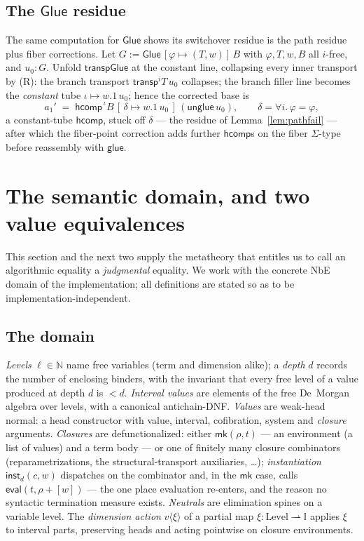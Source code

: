 \documentclass{lmcs}
\newcommand{\I}{\mathbb{I}}
\newcommand{\transp}{\mathsf{transp}}
\newcommand{\hcomp}{\mathsf{hcomp}}
\newcommand{\Glue}{\mathsf{Glue}}
\newcommand{\glue}{\mathsf{glue}}
\newcommand{\unglue}{\mathsf{unglue}}
\newcommand{\evalop}{\mathsf{eval}}
\newcommand{\capp}{\mathsf{inst}}
\begin{document}
\subsection{The $\Glue$ residue}
\label{sec:glueresidue}

The same computation for $\Glue$ shows its switchover residue is the
path residue plus fiber corrections.  Let
$G := \Glue\,[\varphi \mapsto (T, w)]\,B$ with $\varphi, T, w, B$ all
$i$-free, and $u_0 : G$.  Unfold $\mathsf{transpGlue}$
\cite[\S6.2]{CCHM} at the constant line, collapsing every inner
transport by (R): the branch transport $\transp^i T\,u_0$ collapses;
the branch filler line becomes the \emph{constant} tube
$\iota \mapsto w.1\,u_0$; hence the corrected base is
\[
  a_1' \;=\; \hcomp^{\,\iota} B\,[\,\delta \mapsto w.1\,u_0\,]\,
  (\unglue\,u_0), \qquad \delta = \forall i.\,\varphi = \varphi,
\]
a constant-tube $\hcomp$, stuck off $\delta$ --- the residue of
Lemma~\ref{lem:pathfail} --- after which the fiber-point correction
adds further $\hcomp$s on the fiber $\Sigma$-type before reassembly
with $\glue$.

\section{The semantic domain, and two value equivalences}
\label{sec:domain}

This section and the next two supply the metatheory that entitles us
to call an algorithmic equality a \emph{judgmental} equality.  We
work with the concrete NbE domain of the implementation; all
definitions are stated so as to be implementation-independent.

\subsection{The domain}
\label{sec:rawdomain}

\emph{Levels} $\ell \in \mathbb{N}$ name free variables (term and
dimension alike); a \emph{depth} $d$ records the number of enclosing
binders, with the invariant that every free level of a value produced
at depth $d$ is $< d$.  \emph{Interval values} are elements of the
free De~Morgan algebra over levels, with a canonical antichain-DNF.
\emph{Values} are weak-head normal: a head constructor with value,
interval, cofibration, system and \emph{closure} arguments.
\emph{Closures} are defunctionalized: either
$\mathsf{mk}(\rho, t)$ --- an environment (a list of values) and a
term body --- or one of finitely many closure combinators
(reparametrizations, the structural-transport auxiliaries, \dots);
\emph{instantiation} $\capp_d(c, w)$ dispatches on the combinator
and, in the $\mathsf{mk}$ case, calls
$\evalop(t, \rho{+}[w])$ --- the one place evaluation re-enters, and
the reason no syntactic termination measure exists.  \emph{Neutrals}
are elimination spines on a variable level.  The \emph{dimension
action} $v\langle\xi\rangle$ of a partial map
$\xi : \mathrm{Level} \rightharpoonup \I$ applies $\xi$ to interval
parts, preserving heads and acting pointwise on closure
environments.
\end{document}
